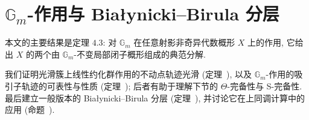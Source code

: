 \section{\texorpdfstring{$\mathbb G_m$}{Gm}-作用与 Białynicki--Birula 分层}\label{src:7.8}
\begin{epigraph}
本文的主要结果是定理 $4.3$: 对 $\mathbb G_m$ 在任意射影非奇异代数概形 $X$ 上的作用, 它给出 $X$ 的两个由 $\mathbb G_m$-不变局部闭子概形组成的典范分解.
\end{epigraph}
我们证明光滑簇上线性约化群作用的不动点轨迹光滑 (定理~), 以及 $\mathbb G_m$-作用的吸引子轨迹的可表性与性质 (定理~); 后者有助于理解下节的 $\Theta$-完备性与 S-完备性. 最后建立一般版本的 Białynicki--Birula 分层 (定理~), 并讨论它在上同调计算中的应用 (命题~).
